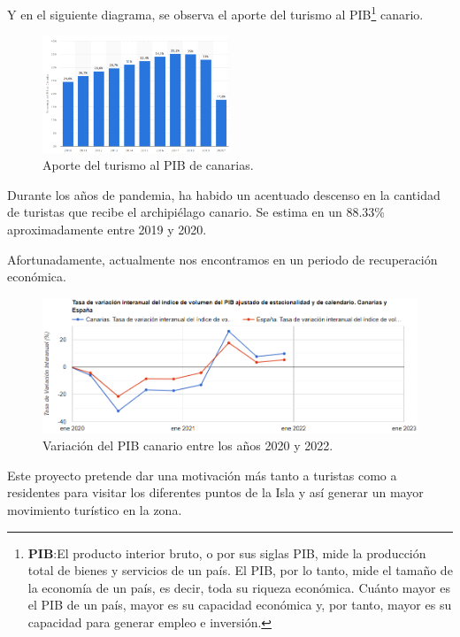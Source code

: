 Y en el siguiente diagrama, se observa el aporte del turismo al PIB\footnote{\textbf{PIB}:El producto interior bruto, o por sus siglas PIB, mide la producción total de bienes y servicios de un país. El PIB, por lo tanto, mide el tamaño de la economía de un país, es decir, toda su riqueza económica. Cuánto mayor es el PIB de un país, mayor es su capacidad económica y, por tanto, mayor es su capacidad para generar empleo e inversión.} canario.
\begin{figure}[H]
    \centering
    \includegraphics[width=0.5\textwidth]{Memoria_TFG_LaTeX/images/pibcanarias2010-2020.PNG}
    \caption{Aporte del turismo al PIB de canarias. \cite{PIBTurismoCanarias2010-2020}}
    \label{fig:PIB2010-2020}
\end{figure}

Durante los años de pandemia, ha habido un acentuado descenso en la cantidad de turistas que recibe el archipiélago canario. Se estima en un 88.33\% aproximadamente entre 2019 y 2020. 


Afortunadamente, actualmente nos encontramos en un periodo de recuperación económica. 
\begin{figure}[H]
    \centering
    \includegraphics[width=1\textwidth]{Memoria_TFG_LaTeX/images/variacionPIB2020-2022.PNG}
    \caption{Variación del PIB canario entre los años 2020 y 2022. \cite{PIBInteranualCanarias2020-2022}}
    \label{fig:PIB2020-2022}
\end{figure}

Este proyecto pretende dar una motivación más tanto a turistas como a residentes para visitar los diferentes puntos de la Isla y así generar un mayor movimiento turístico en la zona.

